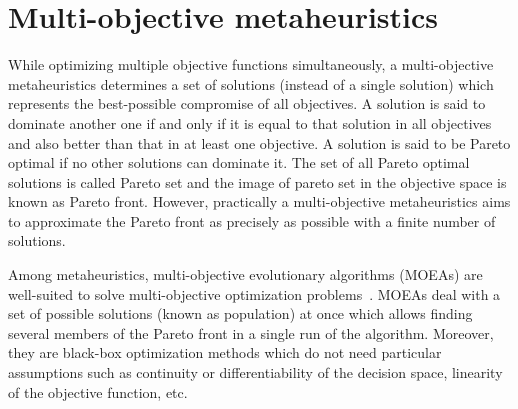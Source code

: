 

\section{Multi-objective metaheuristics}
\label{sec:mop}
While optimizing multiple objective functions simultaneously, a multi-objective metaheuristics determines a set of solutions (instead of a single solution) which represents the best-possible compromise of all objectives. A solution is said to dominate another one if and only if it is equal to that solution in all objectives and also better than that in at least one objective. A solution is said to be Pareto optimal if no other solutions can dominate it. The set of all Pareto optimal solutions is called Pareto set and the image of pareto set in the objective space is known as Pareto front. However, practically a multi-objective metaheuristics aims to approximate the Pareto front as precisely as possible with a finite number of solutions.

Among metaheuristics, multi-objective evolutionary algorithms (MOEAs) are well-suited to solve multi-objective optimization problems~\cite{yang2013grid}. MOEAs deal with a set of possible solutions (known as population) at once which allows finding several members of the Pareto front in a single run of the algorithm. Moreover, they are  black-box optimization methods which do not need particular assumptions such as continuity or differentiability of the decision space, linearity of the objective function, etc. 


